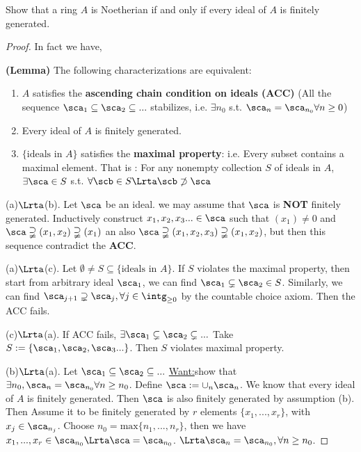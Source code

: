 \begin{exr}
Show that a ring $A$ is Noetherian if and only if every ideal of $A$ is finitely generated.
\end{exr}
\begin{proof}
In fact we have,

\textbf{(Lemma)} The following characterizations are equivalent:
\begin{enumerate}[label=(\alph*)]
\item ${A}$ satisfies the \textbf{ascending chain condition on ideals (ACC)} (All the sequence $\sca_1\subseteq \sca_2\subseteq ...$ stabilizes, i.e. $\exists n_0$ s.t. $\sca_n=\sca_{n_0} \forall n\geq 0$)
\item Every ideal of ${A}$ is finitely generated.
\item $\{\text{ideals in ${A}$}\}$ satisfies the \textbf{maximal property}: i.e. Every subset contains a maximal element. That is : For any nonempty collection $S$ of ideals in ${A}$, $\exists \sca\in S$ s.t. $\forall \scb\in S\Lrta \scb\not \supset \sca$
\end{enumerate}

(a)$\Lrta$(b). Let $\sca$ be an ideal. we may assume that $\sca$ is \textbf{NOT} finitely generated. Inductively construct $x_1, x_2,x_3...\in \sca$ such that $(x_1)\neq 0$ and $\sca\supsetneqq(x_1,x_2)\supsetneqq(x_1)$ an also $\sca\supsetneqq(x_1,x_2,x_3)\supsetneqq(x_1,x_2)$, but then this sequence contradict the \textbf{ACC}.

(a)$\Lrta$(c). Let $\emptyset \neq S\subseteq \{\text{ideals in }{A}\}$. If $S$ violates the maximal property, then start from arbitrary ideal $\sca_1$, we can find $\sca_1\subsetneq \sca_2\in S$. Similarly, we can find $\sca_{j+1}\supsetneq \sca_j,\forall j\in\intg_{\geq 0}$ by the countable choice axiom. Then the ACC fails.

(c)$\Lrta $(a). If ACC fails, $\exists \sca_1\subsetneq \sca_2\subsetneq ...$ Take $S:=\{\sca_1,\sca_2,\sca_3...\}$. Then $S$ violates maximal property.

(b)$\Lrta$(a). Let $\sca_1\subseteq\sca_2\subseteq ...$ \underline{Want:}show that $\exists n_0,\sca_n=\sca_{n_0}\forall n\geq n_0$.
Define $\sca:=\cup_n \sca_n$. We know that every ideal of ${A}$ is finitely generated. Then $\sca$ is also finitely generated by assumption (b). Then Assume it to be finitely generated by $r$ elements $\{x_1,...,x_r\}$, with $x_j\in\sca_{n_j}$. Choose $n_0=\text{max}\{n_1,...,n_r\}$, then we have $x_1,...,x_r\in \sca_{n_0}\Lrta \sca=\sca_{n_0}$. $\Lrta \sca_n=\sca_{n_0},\forall n\geq n_0$.
\end{proof}

